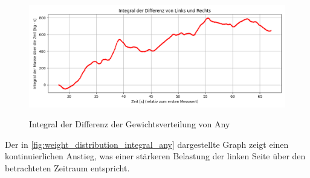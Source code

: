 
\begin{figure}
  \centering
  \includegraphics[width=0.8\linewidth]{img/pyplots/Integral der Differenz - Any.png}\\
  \caption{Integral der Differenz der Gewichtsverteilung von Any}
  \label{fig:weight_distribution_integral_any}
\end{figure}

Der in \autoref{fig:weight_distribution_integral_any} dargestellte Graph zeigt einen kontinuierlichen Anstieg, was einer stärkeren Belastung der linken Seite über den betrachteten Zeitraum entspricht. 


